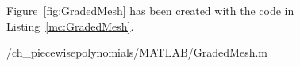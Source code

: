 \begin{problem}
\begin{subproblem}[3]
\begin{solution}
Figure~\ref{fig:GradedMesh} has been created with the code in Listing~\ref{mc:GradedMesh}.

{\problems/ch_piecewisepolynomials/MATLAB/GradedMesh.m}
\end{solution}
\end{subproblem}

\end{problem}

%